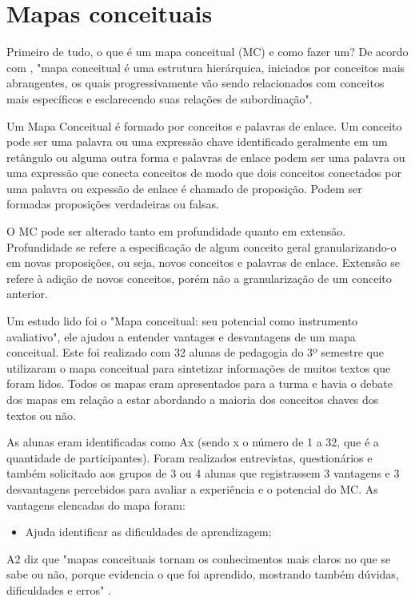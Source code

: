 \section[Mapas Conceituais]{Mapas conceituais}

Primeiro de tudo, o que é um mapa conceitual (MC) e como fazer um? De acordo com , "mapa conceitual é uma estrutura hierárquica, iniciados por conceitos mais abrangentes, os quais progressivamente vão sendo relacionados com conceitos mais específicos e esclarecendo suas relações de subordinação". 

Um Mapa Conceitual é formado por conceitos e palavras de enlace. Um conceito pode ser uma palavra ou uma expressão chave identificado geralmente em um retângulo ou alguma outra forma e palavras de enlace podem ser uma palavra ou uma expressão que conecta conceitos de modo que dois conceitos conectados por uma palavra ou expessão de enlace é chamado de proposição. Podem ser formadas proposições verdadeiras ou falsas.

O MC pode ser alterado tanto em profundidade quanto em extensão. Profundidade se refere a especificação de algum conceito geral granularizando-o em novas proposições, ou seja, novos conceitos e palavras de enlace. Extensão se refere à adição de novos conceitos, porém não a granularização de um conceito anterior.


Um estudo lido foi o "Mapa conceitual: seu potencial como instrumento avaliativo", ele ajudou a entender vantages e desvantagens de um mapa conceitual. Este foi realizado com 32 alunas de pedagogia do 3º semestre que utilizaram o mapa conceitual para sintetizar informações de muitos textos que foram lidos. Todos os mapas eram apresentados para a turma e havia o debate dos mapas em relação a estar abordando a maioria dos conceitos chaves dos textos ou não. 

As alunas eram identificadas como Ax (sendo x o número de 1 a 32, que é a quantidade de participantes). Foram realizados entrevistas, questionários e também solicitado aos grupos de 3 ou 4 alunas que registrassem 3 vantagens e 3 desvantagens percebidos para avaliar a experiência e o potencial do MC. As vantagens elencadas do mapa foram: 

\begin{itemize}
\item Ajuda identificar as dificuldades de aprendizagem;
\end{itemize}

A2 diz que "mapas conceituais tornam os conhecimentos mais claros no que se sabe ou não, porque evidencia o que foi aprendido, mostrando também dúvidas, dificuldades e erros" \cite{vantagensDesvantagensMC}.


